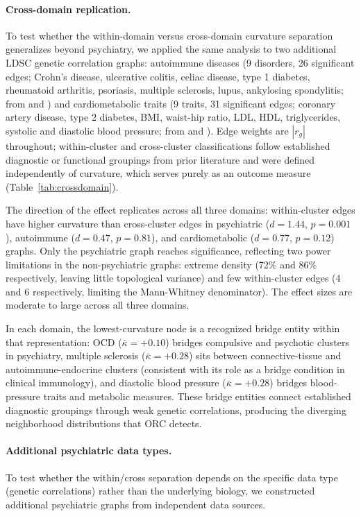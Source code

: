 \documentclass[11pt]{article}
\begin{document}
\paragraph{Cross-domain replication.} To test whether the within-domain versus cross-domain curvature separation generalizes beyond psychiatry, we applied the same analysis to two additional LDSC genetic correlation graphs: autoimmune diseases (9 disorders, 26 significant edges; Crohn's disease, ulcerative colitis, celiac disease, type 1 diabetes, rheumatoid arthritis, psoriasis, multiple sclerosis, lupus, ankylosing spondylitis; from \citealt{buliksullivan2015atlas} and \citealt{ellinghaus2016analysis}) and cardiometabolic traits (9 traits, 31 significant edges; coronary artery disease, type 2 diabetes, BMI, waist-hip ratio, LDL, HDL, triglycerides, systolic and diastolic blood pressure; from \citealt{buliksullivan2015atlas} and \citealt{evangelou2018genetic}). Edge weights are $|r_g|$ throughout; within-cluster and cross-cluster classifications follow established diagnostic or functional groupings from prior literature and were defined independently of curvature, which serves purely as an outcome measure (Table~\ref{tab:crossdomain}).

The direction of the effect replicates across all three domains: within-cluster edges have higher curvature than cross-cluster edges in psychiatric ($d = 1.44$, $p = 0.001$), autoimmune ($d = 0.47$, $p = 0.81$), and cardiometabolic ($d = 0.77$, $p = 0.12$) graphs. Only the psychiatric graph reaches significance, reflecting two power limitations in the non-psychiatric graphs: extreme density (72\% and 86\% respectively, leaving little topological variance) and few within-cluster edges (4 and 6 respectively, limiting the Mann-Whitney denominator). The effect sizes are moderate to large across all three domains.

In each domain, the lowest-curvature node is a recognized bridge entity within that representation: OCD ($\bar{\kappa} = +0.10$) bridges compulsive and psychotic clusters in psychiatry, multiple sclerosis ($\bar{\kappa} = +0.28$) sits between connective-tissue and autoimmune-endocrine clusters (consistent with its role as a bridge condition in clinical immunology), and diastolic blood pressure ($\bar{\kappa} = +0.28$) bridges blood-pressure traits and metabolic measures. These bridge entities connect established diagnostic groupings through weak genetic correlations, producing the diverging neighborhood distributions that ORC detects.

\paragraph{Additional psychiatric data types.} To test whether the within/cross separation depends on the specific data type (genetic correlations) rather than the underlying biology, we constructed additional psychiatric graphs from independent data sources.
\end{document}
